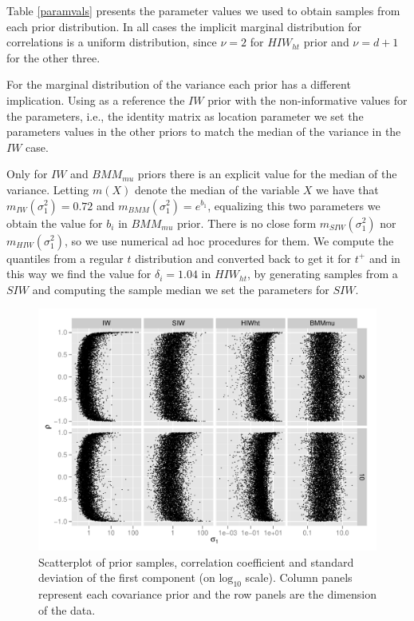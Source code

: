 \documentclass{article}
\begin{document}
Table \ref{paramvals} presents the parameter values we used to obtain samples from each prior distribution. In all cases the implicit marginal distribution for correlations is a uniform distribution, since $\nu=2$ for $HIW_{ht}$ prior and $\nu=d+1$ for the other three. 

 For the marginal distribution of the variance each prior has a different implication. Using as a reference the $IW$ prior with the non-informative values for the parameters, i.e., the identity matrix as location parameter we set the parameters values in the other priors to match the median of the variance in the $IW$ case.  

Only for $IW$ and $BMM_{mu}$ priors there is an explicit value for the median of the variance. Letting $m(X)$ denote the median of the variable $X$ we have that  $m_{IW}(\sigma_1^2) = 0.72$ and $m_{BMM}(\sigma_1^2) = e^{b_1}$, equalizing this two parameters we obtain the value for $b_i$ in $BMM_{mu}$ prior. 
There is no close form $m_{SIW}(\sigma_1^2)$  nor $m_{HIW}(\sigma_1^2)$, so we use numerical ad hoc procedures for them. We compute the quantiles from a regular $t$ distribution and converted back to get it for $t^{+}$ and in this way we find the value for $\delta_i=1.04$ in $HIW_{ht}$, by generating samples from a $SIW$ and computing the sample median we set the parameters for $SIW$. 

\begin{figure}[htbp]
\begin{center}
 \includegraphics[width=\textwidth ]{priorsim2d} 
 \vspace{-.5in}
\caption{Scatterplot of prior samples, correlation coefficient and standard deviation of the first component (on $\mbox{log}_{10}$ scale). Column panels represent each covariance prior and the row panels are the dimension of the data.  \label{priorF1}}
\end{center}
\end{figure}
\end{document}
